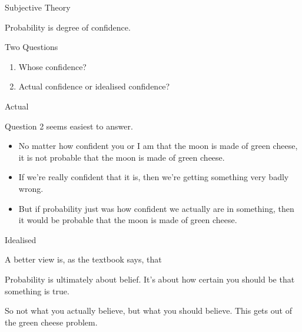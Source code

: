 \documentclass[
  ignorenonframetext,
]{beamer}
\providecommand{\tightlist}{%
  \setlength{\itemsep}{0pt}\setlength{\parskip}{0pt}}
\renewcommand{\,}{\text{, }}
\renewenvironment*{quote}	
	{\list{}{\rightmargin   \leftmargin} \item } 	
	{\endlist }
\begin{document}
\begin{frame}{Subjective Theory}
\protect\hypertarget{subjective-theory}{}

Probability is degree of confidence.

\end{frame}

\begin{frame}{Two Questions}
\protect\hypertarget{two-questions-1}{}

\begin{enumerate}
\tightlist
\item
  Whose confidence? \pause
\item
  Actual confidence or idealised confidence?
\end{enumerate}

\end{frame}

\begin{frame}{Actual}
\protect\hypertarget{actual}{}

Question 2 seems easiest to answer.

\begin{itemize}
\tightlist
\item
  No matter how confident you or I am that the moon is made of green
  cheese, it is not probable that the moon is made of green cheese.
\item
  If we're really confident that it is, then we're getting something
  very badly wrong.
\item
  But if probability just was how confident we actually are in
  something, then it would be probable that the moon is made of green
  cheese.
\end{itemize}

\end{frame}

\begin{frame}{Idealised}
\protect\hypertarget{idealised}{}

A better view is, as the textbook says, that

\begin{quote}
Probability is ultimately about belief. It's about how certain you
should be that something is true.
\end{quote}

So not what you actually believe, but what you should believe. This gets
out of the green cheese problem.

\end{frame}
\end{document}
